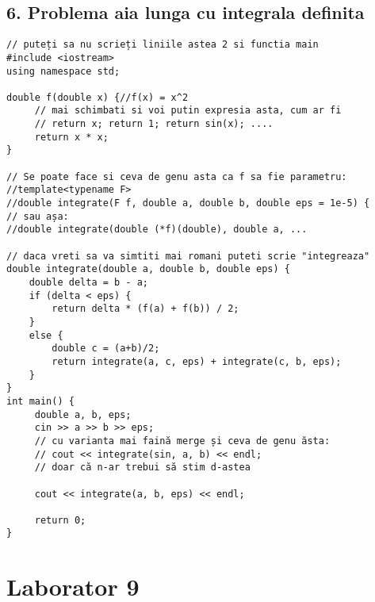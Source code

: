 \documentclass[11pt]{article}
\begin{document}
\subsection*{6. Problema aia lunga cu integrala definita}
\label{sec:org68c43a1}
\begin{verbatim}
// puteți sa nu scrieți liniile astea 2 si functia main
#include <iostream>
using namespace std;

double f(double x) {//f(x) = x^2
     // mai schimbati si voi putin expresia asta, cum ar fi 
     // return x; return 1; return sin(x); ....
     return x * x;
}

// Se poate face si ceva de genu asta ca f sa fie parametru:
//template<typename F>
//double integrate(F f, double a, double b, double eps = 1e-5) {
// sau așa:
//double integrate(double (*f)(double), double a, ...

// daca vreti sa va simtiti mai romani puteti scrie "integreaza"
double integrate(double a, double b, double eps) {
    double delta = b - a;
    if (delta < eps) {
        return delta * (f(a) + f(b)) / 2;
    }
    else {
        double c = (a+b)/2;
        return integrate(a, c, eps) + integrate(c, b, eps);
    }
}
int main() {
     double a, b, eps;
     cin >> a >> b >> eps;
     // cu varianta mai faină merge și ceva de genu ăsta:
     // cout << integrate(sin, a, b) << endl;
     // doar că n-ar trebui să stim d-astea

     cout << integrate(a, b, eps) << endl;

     return 0;
}
\end{verbatim}
\pagebreak

\section*{Laborator 9}
\label{sec:org04e1a5f}
\end{document}
